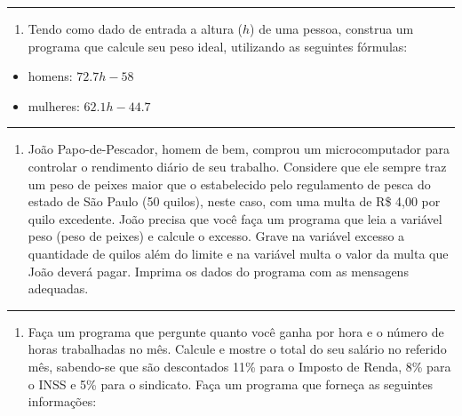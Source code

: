 \documentclass[12pt,a4paper]{article}
\renewcommand{\linethickness}{0.05em}
\providecommand{\tightlist}{%
      \setlength{\itemsep}{0pt}\setlength{\parskip}{0pt}}
\begin{document}
    \begin{center}\rule{0.5\linewidth}{\linethickness}\end{center}

\begin{enumerate}
\def\labelenumi{\arabic{enumi}.}
\setcounter{enumi}{6}
\tightlist
\item
  Tendo como dado de entrada a altura (\(h\)) de uma pessoa, construa um
  programa que calcule seu peso ideal, utilizando as seguintes fórmulas:
\end{enumerate}

\begin{itemize}
\tightlist
\item
  homens: \(72.7h - 58\)
\item
  mulheres: \(62.1h - 44.7\)
\end{itemize}

    \begin{center}\rule{0.5\linewidth}{\linethickness}\end{center}

\begin{enumerate}
\def\labelenumi{\arabic{enumi}.}
\setcounter{enumi}{7}
\tightlist
\item
  João Papo-de-Pescador, homem de bem, comprou um microcomputador para
  controlar o rendimento diário de seu trabalho. Considere que ele
  sempre traz um peso de peixes maior que o estabelecido pelo
  regulamento de pesca do estado de São Paulo (50 quilos), neste caso,
  com uma multa de R\$ 4,00 por quilo excedente. João precisa que você
  faça um programa que leia a variável peso (peso de peixes) e calcule o
  excesso. Grave na variável excesso a quantidade de quilos além do
  limite e na variável multa o valor da multa que João deverá pagar.
  Imprima os dados do programa com as mensagens adequadas.
\end{enumerate}

    \begin{center}\rule{0.5\linewidth}{\linethickness}\end{center}

\begin{enumerate}
\def\labelenumi{\arabic{enumi}.}
\setcounter{enumi}{8}
\tightlist
\item
  Faça um programa que pergunte quanto você ganha por hora e o número de
  horas trabalhadas no mês. Calcule e mostre o total do seu salário no
  referido mês, sabendo-se que são descontados 11\% para o Imposto de
  Renda, 8\% para o INSS e 5\% para o sindicato. Faça um programa que
  forneça as seguintes informações:
\end{enumerate}
\end{document}
